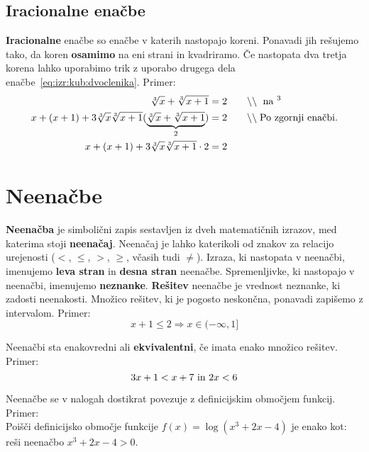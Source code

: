 \documentclass[a4paper,oneside,12pt,fleqn]{article}
\makeatletter
\newcommand\krat\cdot
\newcommand{\comment}[1]{\ensuremath{\qquad\backslash\backslash\;}\textnormal{#1}}
\newcommand{\hyperanchor}[1]{\Hy@raisedlink{\hypertarget{#1}{}}}
\renewcommand\implies\Rightarrow
\numberwithin{equation}{section}
\makeatother
\begin{document}
\subsection{Iracionalne enačbe}
\textbf{Iracionalne} enačbe so enačbe v katerih nastopajo koreni. Ponavadi jih rešujemo
tako, da koren \textbf{osamimo} na eni strani in kvadriramo. Če nastopata dva tretja korena lahko
uporabimo trik z uporabo drugega dela enačbe~\ref{eq:izr:kub:dvoclenika}. Primer:
\begin{align*}
  \sqrt[3]{x} + \sqrt[3]{x+1} &= 2  \comment{ na $^3$} \\
  x + (x+1) + 3\sqrt[3]{x}\sqrt[3]{x+1}(\underbrace{\sqrt[3]{x} + \sqrt[3]{x+1}}_{2}) &=  2
  \comment{Po zgornji enačbi.} \\
  x + (x+1) + 3\sqrt[3]{x}\sqrt[3]{x+1} \krat 2 &= 2
\end{align*}


\section{Neenačbe}
\label{sec:neenac}
\textbf{Neenačba} je simbolični zapis sestavljen iz dveh matematičnih
izrazov, med katerima stoji \textbf{neenačaj}. \hyperanchor{point:neenacaj}
Neenačaj je lahko katerikoli od znakov za relacijo
urejenosti ($<$, $\leq$, $>$, $\geq$, včasih tudi $\neq$). Izraza, ki nastopata v neenačbi,
imenujemo \textbf{leva stran} in \textbf{desna stran} neenačbe.
Spremenljivke, ki nastopajo v neenačbi, imenujemo \textbf{neznanke}.
\textbf{Rešitev} neenačbe je vrednost neznanke, ki zadosti neenakosti.
Množico rešitev, ki je pogosto neskončna, ponavadi zapišemo z intervalom.
Primer:
\[ x + 1 \leq 2 \implies x \in (-\infty, 1] \]

Neenačbi sta enakovredni ali \textbf{ekvivalentni}, če imata enako množico rešitev.
Primer:
\[ 3x + 1 < x + 7 \textnormal{ in } 2x < 6 \]

Neenačbe se v nalogah dostikrat povezuje z definicijskim območjem funkcij. Primer:\\
Poišči definicijsko območje funkcije $f(x) = \log(x^3 + 2x - 4)$ je enako kot: reši
neenačbo $x^3 + 2x - 4 >0$.
\end{document}
